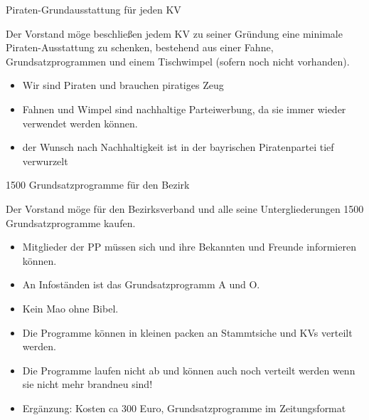 \documentclass{protokoll}
\begin{document}
\begin{Antrag}
        {Piraten-Grundausstattung für jeden KV}
        {\abgelehnt}


\begin{Text}
Der Vorstand möge beschließen jedem KV zu seiner Gründung eine
minimale Piraten-Ausstattung zu schenken, bestehend aus einer Fahne,
Grundsatzprogrammen und einem Tischwimpel (sofern noch nicht
vorhanden).
\end{Text}

\begin{Begründung}
\begin{itemize}
\item Wir sind Piraten und brauchen piratiges Zeug
\item Fahnen und Wimpel sind nachhaltige Parteiwerbung, da sie immer wieder verwendet werden können.
\item der Wunsch nach Nachhaltigkeit ist in der bayrischen Piratenpartei tief verwurzelt
\end{itemize}
\end{Begründung}


\end{Antrag}



\begin{Antrag}
        {1500 Grundsatzprogramme für den Bezirk}
        {\angenommen}


\begin{Text}
Der Vorstand möge für den Bezirksverband und alle seine Untergliederungen 1500 Grundsatzprogramme kaufen.
\end{Text}

\begin{Begründung}
\begin{itemize}
\item Mitglieder der PP müssen sich und ihre Bekannten und Freunde informieren können.
\item An Infoständen ist das Grundsatzprogramm A und O. 
\item Kein Mao ohne Bibel.
\item Die Programme können in kleinen packen an Stammtsiche und KVs verteilt werden.
\item Die Programme laufen nicht ab und können auch noch verteilt werden wenn sie nicht mehr brandneu sind!
\item Ergänzung: Kosten ca 300 Euro, Grundsatzprogramme im Zeitungsformat
\end{itemize}
\end{Begründung}


\end{Antrag}
\end{document}
